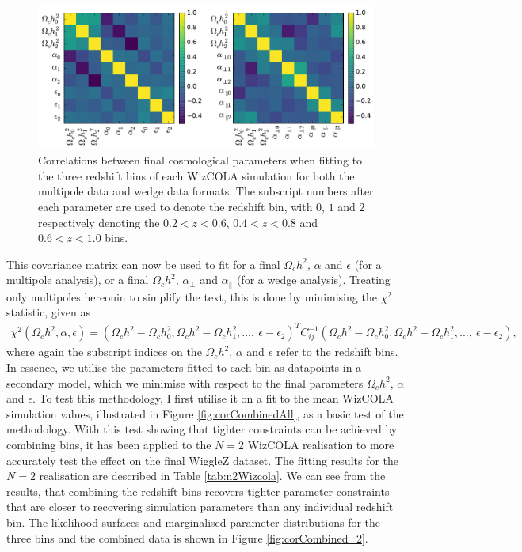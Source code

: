 \documentclass[titlesmallcaps, examinerscopy, copyrightpage]{uqthesis}
\begin{document}
\begin{figure}[h!]
  \begin{center}
    \includegraphics[width=\textwidth]{images/correlations.pdf}
  \end{center}
  \caption{Correlations between final cosmological parameters when fitting to the three redshift bins of each WizCOLA simulation for both the multipole data and wedge data formats. The subscript numbers after each parameter are used to denote the redshift bin, with $0$, $1$ and $2$ respectively denoting the $0.2 < z < 0.6$, $0.4 < z < 0.8$ and $0.6 < z < 1.0$ bins. }
  \label{fig:correlations}
\end{figure}

This covariance matrix can now be used to fit for a final $\Omega_c h^2$, $\alpha$ and $\epsilon$ (for a multipole analysis), or a final $\Omega_c h^2$, $\alpha_\perp$ and $\alpha_\parallel$ (for a wedge analysis). Treating only multipoles hereonin to simplify the text, this is done by  minimising the $\chi^2$ statistic, given as
\begin{align} \label{eq:covchi}
\chi^2(\Omega_c h^2, \alpha, \epsilon) = (\Omega_c h^2 - \Omega_c h^2_0, \Omega_c h^2 - \Omega_c h^2_1, ...,\  \epsilon - \epsilon_2)^T C_{ij}^{-1}(\Omega_c h^2 - \Omega_c h^2_0, \Omega_c h^2 - \Omega_c h^2_1, ...,\  \epsilon - \epsilon_2),
\end{align}
where again the subscript indices on the $\Omega_c h^2$, $\alpha$ and $\epsilon$ refer to the redshift bins. In essence, we utilise the parameters fitted to each bin as datapoints in a secondary model, which we minimise with respect to the final parameters $\Omega_c h^2$, $\alpha$ and $\epsilon$. To test this methodology, I first utilise it on a fit to the mean WizCOLA simulation values, illustrated in Figure \ref{fig:corCombinedAll}, as a basic test of the methodology. With this test showing that tighter constraints can be achieved by combining bins, it has been applied to the $N=2$ WizCOLA realisation to more accurately test the effect on the final WiggleZ dataset.  The fitting results for the $N=2$ realisation are described in Table \ref{tab:n2Wizcola}. We can see from the results, that combining the redshift bins recovers tighter parameter constraints that are closer to recovering simulation parameters than any individual redshift bin. The likelihood surfaces and marginalised parameter distributions for the three bins and the combined data is shown in Figure \ref{fig:corCombined_2}.
\end{document}
